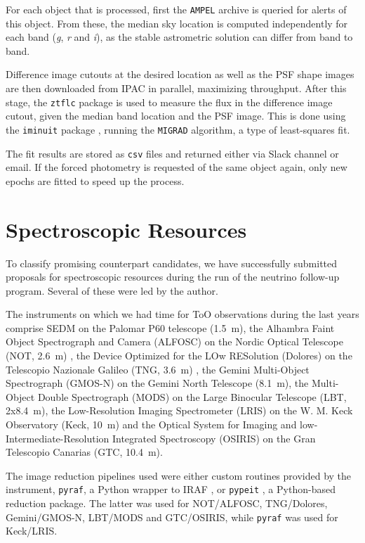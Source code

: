 For each object that is processed, first the \texttt{AMPEL} archive is queried for alerts of this object. From these, the median sky location is computed independently for each band (\textit{g}, \textit{r} and \textit{i}), as the stable astrometric solution can differ from band to band.

Difference image cutouts at the desired location as well as the PSF shape images are then downloaded from IPAC in parallel, maximizing throughput. After this stage, the \texttt{ztflc} package is used to measure the flux in the difference image cutout, given the median band location and the PSF image. This is done using the \texttt{iminuit} package , running the \texttt{MIGRAD}  algorithm, a type of least-squares fit.

The fit results are stored as \texttt{csv} files and returned either via Slack channel or email. If the forced photometry is requested of the same object again, only new epochs are fitted to speed up the process.

\section{Spectroscopic Resources}
To classify promising counterpart candidates, we have successfully submitted proposals for spectroscopic resources during the run of the neutrino follow-up program. Several of these were led by the author.

The instruments on which we had time for ToO observations during the last years comprise SEDM on the Palomar P60 telescope (\SI{1.5}{\meter}), the Alhambra Faint Object Spectrograph and Camera (ALFOSC) on the Nordic Optical Telescope (NOT, \SI{2.6}{\meter}) , the Device Optimized for the LOw RESolution (Dolores) on the Telescopio Nazionale Galileo (TNG, \SI{3.6}{\meter}) , the Gemini Multi-Object Spectrograph (GMOS-N)  on the Gemini North Telescope (\SI{8.1}{\meter}), the Multi-Object Double Spectrograph (MODS)  on the Large Binocular Telescope (LBT, 2x\SI{8.4}{\meter}), the Low-Resolution Imaging Spectrometer (LRIS)  on the W. M. Keck Observatory (Keck, \SI{10}{\meter}) and the Optical System for Imaging and low-Intermediate-Resolution Integrated Spectroscopy (OSIRIS)  on the Gran Telescopio Canarias (GTC, \SI{10.4}{\meter}).

The image reduction pipelines used were either custom routines provided by the instrument, \texttt{pyraf}, a Python wrapper to IRAF , or \texttt{pypeit} , a Python-based reduction package. The latter was used for NOT/ALFOSC, TNG/Dolores, Gemini/GMOS-N, LBT/MODS and GTC/OSIRIS, while \texttt{pyraf} was used for Keck/LRIS.

